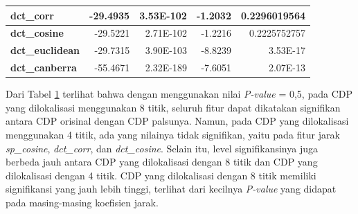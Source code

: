 \begin{table}[h]
\begin{tabular}{|l|rr|rr|}
		\textbf{dct\_corr}      & \multicolumn{1}{r|}{-29.4935}             & 3.53E-102                             & \multicolumn{1}{r|}{-1.2032}              & 0.2296019564                          \\ \hline
		\textbf{dct\_cosine}    & \multicolumn{1}{r|}{-29.5221}             & 2.71E-102                             & \multicolumn{1}{r|}{-1.2216}              & 0.2225752757                          \\ \hline
		\textbf{dct\_euclidean} & \multicolumn{1}{r|}{-29.7315}             & 3.90E-103                             & \multicolumn{1}{r|}{-8.8239}              & 3.53E-17                              \\ \hline
		\textbf{dct\_canberra}  & \multicolumn{1}{r|}{-55.4671}             & 2.32E-189                             & \multicolumn{1}{r|}{-7.6051}              & 2.07E-13                              \\ \hline
	\end{tabular}
	\label{Tab: 4-hasilujisignifikansiorivspalsu}
\end{table}

Dari Tabel \ref{Tab: 4-hasilujisignifikansiorivspalsu} terlihat bahwa dengan menggunakan nilai \emph{P-value} = 0,5, pada CDP yang dilokalisasi menggunakan 8
titik, seluruh fitur dapat dikatakan signifikan antara CDP orisinal dengan CDP palsunya. Namun, pada CDP yang dilokalisasi menggunakan 4 titik, ada yang
nilainya tidak signifikan, yaitu pada fitur jarak \emph{sp\_cosine}, \emph{dct\_corr}, dan \emph{dct\_cosine}. Selain itu, level signifikansinya juga berbeda
jauh antara CDP yang dilokalisasi dengan 8 titik dan CDP yang dilokalisasi dengan 4 titik. CDP yang dilokalisasi dengan 8 titik memiliki signifikansi yang jauh
lebih tinggi, terlihat dari kecilnya \emph{P-value} yang didapat pada masing-masing koefisien jarak.


